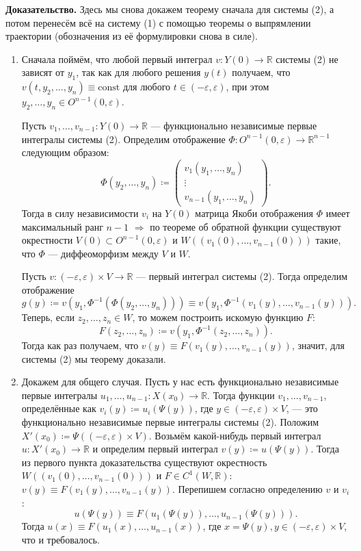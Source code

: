 \textbf{Доказательство.} Здесь мы снова докажем теорему сначала для системы (2), а потом перенесём всё на систему (1) с помощью теоремы о выпрямлении траектории (обозначения из её формулировки снова в силе).
\begin{enumerate}
    \item Сначала поймём, что любой первый интеграл $v\colon Y(0) \to \mathbb{R}$ системы (2) не зависят от $y_1$, так как для любого решения $y(t)$ получаем, что $v(t, y_2, \dots, y_n) \equiv \text{const}$ для любого $t \in (-\varepsilon, \varepsilon)$, при этом $y_2, \dots, y_n \in O^{n-1}(0, \varepsilon)$.

    Пусть $v_1, \dots, v_{n-1}\colon Y(0) \to \mathbb{R}$ --- функционально независимые первые интегралы системы (2). Определим отображение $\Phi\colon O^{n-1}(0, \varepsilon) \to \mathbb{R}^{n-1}$ следующим образом:
    \[
        \Phi(y_2, \dots, y_n) \coloneq \begin{pmatrix}
            v_1(y_1, \dots, y_n)\\
            \vdots\\
            v_{n-1}(y_1, \dots, y_n)
        \end{pmatrix}.
    \]
    Тогда в силу независимости $v_i$ на $Y(0)$ матрица Якоби отображения $\Phi$ имеет максимальный ранг $n-1$ $\Rightarrow$ по теореме об обратной функции существуют окрестности $V(0) \subset O^{n-1}(0, \varepsilon)$ и $W((v_1(0), \dots, v_{n-1}(0)))$ такие, что $\Phi$ --- диффеоморфизм между $V$ и $W$.

    Пусть $v\colon (-\varepsilon, \varepsilon) \times V \to \mathbb{R}$ --- первый интеграл системы (2). Тогда определим отображение 
    \[
        g(y) \coloneq v(y_1, \Phi^{-1}(\Phi(y_2, \dots, y_n))) \equiv v(y_1, \Phi^{-1}(v_1(y), \dots, v_{n-1}(y))).
    \]
    Теперь, если $z_2, \dots, z_n \in W$, то можем построить искомую функцию $F$:
    \[
        F(z_2, \dots, z_n) \coloneq v(y_1, \Phi^{-1}(z_2, \dots, z_n)).
    \]
    Тогда как раз получаем, что $v(y) \equiv F(v_1(y), \dots, v_{n-1}(y))$, значит, для системы (2) мы теорему доказали.
    \item Докажем для общего случая. Пусть у нас есть функционально независимые первые интегралы $u_1, \dots, u_{n-1}\colon X(x_0) \to \mathbb{R}$. Тогда функции $v_1, \dots, v_{n-1}$, определённые как $v_i(y) \coloneq u_i(\Psi(y))$, где $y \in (-\varepsilon, \varepsilon) \times V$, --- это функционально независимые первые интегралы системы (2).
    Положим $X'(x_0) \coloneq \Psi((-\varepsilon, \varepsilon) \times V)$. Возьмём какой-нибудь первый интеграл $u\colon X'(x_0) \to \mathbb{R}$ и определим первый интеграл $v(y) \coloneq u(\Psi(y))$. Тогда из первого пункта доказательства существуют окрестность $W((v_1(0), \dots, v_{n-1}(0)))$ и $F \in C^1(W, \mathbb{R})$: $v(y) \equiv F(v_1(y), \dots, v_{n-1}(y))$. Перепишем согласно определению $v$ и $v_i$:
    \[
        u(\Psi(y)) \equiv F(u_1(\Psi(y)), \dots, u_{n-1}(\Psi(y))).
    \]
    Тогда $u(x) \equiv F(u_1(x), \dots, u_{n-1}(x))$, где $x = \Psi(y), y \in (-\varepsilon, \varepsilon) \times V$, что и требовалось.

    \QED
\end{enumerate}

